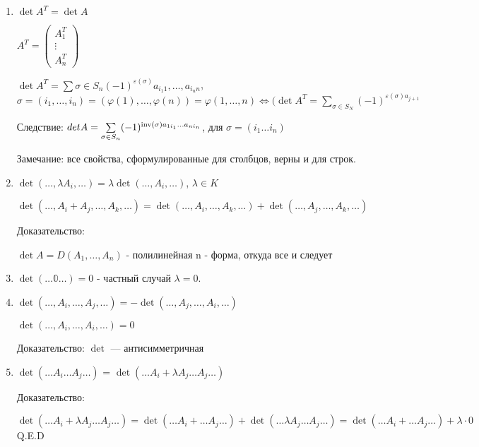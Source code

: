 \begin{enumerate}
    \item \(\det A^T = \det A\)

          \(A^T = \begin{pmatrix}
              A_1^T  \\
              \vdots \\
              A_n^T
          \end{pmatrix}\)

          \(\det A^T = \sum\limits{\sigma \in S_n} (-1) ^{\varepsilon(\sigma)} a_{i_1 1}, \ldots, a_{i_n n}\), \(\sigma = (i_1, \ldots, i_n) = (\varphi(1), \ldots, \varphi(n)) = \varphi(1, \ldots, n) \Leftrightarrow (\det A^T = \sum\limits_{\sigma \in S_N} (-1) ^{\varepsilon(\sigma) a_{j+1}}\)

          Следствие: \(det A = \sum\limits_{\sigma \in S_n}(-1)^{\operatorname{inv} (\sigma)a_{1i_1}\ldots a_{ni_n}}\), для \(\sigma = (i_1\ldots i_n)\)

          Замечание: все свойства, сформулированные для столбцов, верны и для строк.

    \item \(\det(\ldots, \lambda A_i, \ldots) = \lambda \det(\ldots, A_i, \ldots)\), \(\lambda \in K\)

          \(\det(\ldots, A_i + A_j, \ldots, A_k, \ldots) = \det(\ldots, A_i, \ldots, A_k, \ldots) + \det(\ldots, A_j, \ldots, A_k, \ldots)\)

          Доказательство:

          \(\det A  = D(A_1,\ldots, A_n) \) - полилинейная n - форма, откуда все и следует

    \item \(\det ( \ldots\mathbb{0}\ldots) = 0 \) - частный случай $\lambda =0$.

    \item \(\det(\ldots, A_i, \ldots, A_j, \ldots) = -\det(\ldots, A_j, \ldots, A_i, \ldots)\)

          \(\det(\ldots, A_i, \ldots, A_i, \ldots) = 0\)

          Доказательство:
          \(\det\) --- антисимметричная

    \item \(\det (\ldots A_i\ldots A_j\ldots)\) = \(\det (\ldots A_i + \lambda A_j\ldots A_j\ldots)\)

          Доказательство:

          \(\det (\ldots A_i + \lambda A_j\ldots A_j\ldots) = \det (\ldots A_i + \ldots A_j\ldots)  + \det (\ldots \lambda A_j\ldots A_j\ldots) = \det (\ldots A_i + \ldots A_j\ldots) + \lambda\cdot 0\) Q.E.D



\end{enumerate}
